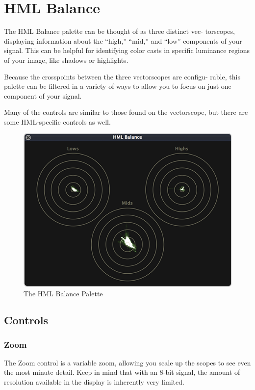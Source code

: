 \documentclass[10,letterpaper,]{report}
\begin{document}
\chapter{HML Balance}

The HML Balance palette can be thought of as three distinct vec-
torscopes, displaying information about the ``high,'' ``mid,'' and
``low'' components of your signal. This can be helpful for identifying
color casts in specific luminance regions of your image, like shadows or
highlights.

Because the crosspoints between the three vectorscopes are configu-
rable, this palette can be filtered in a variety of ways to allow you to
focus on just one component of your signal.

Many of the controls are similar to those found on the vectorscope, but
there are some HML-specific controls as well.

\begin{figure}[htbp]
\centering
\includegraphics{images/HMLBalance.png}
\caption{The HML Balance Palette}
\end{figure}

\section{Controls}

\subsection{Zoom}

The Zoom control is a variable zoom, allowing you scale up the scopes to
see even the most minute detail. Keep in mind that with an 8-bit signal,
the amount of resolution available in the display is inherently very
limited.
\end{document}
